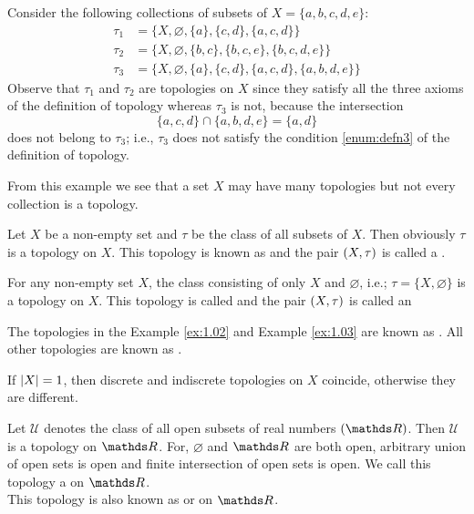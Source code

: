 \documentclass[../main-sheet.tex]{subfiles}
\begin{document}
    \begin{ex}
        Consider the following collections of subsets of  \(X = \{a,b, c, d,e\}\):
        \begin{align*}
            \tau_1 &= \{X, \varnothing, \{a\}, \{c,d\},\{a,c,d\}\}\\
            \tau_2 &= \{X, \varnothing, \{b, c\}, \{b, c, e\}, \{b, c, d,e\}\}\\
            \tau_3&= \{X,\varnothing, \{a\}, \{c, d\}, \{a,c,d\}, \{a, b, d, e\}\}
        \end{align*}            
        Observe that  \(\tau_1\) and  \(\tau_2\) are topologies on  \(X\) since they satisfy all the three axioms of the definition of topology whereas  \(\tau_3\) is not, because the intersection
        \[
            \{a, c, d\} \cap \{a, b, d, e\} = \{a,d\}
        \]
        does not belong to  \(\tau_3\); i.e.,  \(\tau_3\) does not satisfy the condition \ref{enum:defn3} of the definition of topology.
    \end{ex}
From this example we see that a set  \(X\) may have many topologies but not every collection is a topology.
\begin{ex}
    \label{ex:1.02}
    Let  \(X\) be a non-empty set and  \(\tau\) be the class of all subsets of  \(X\). Then obviously  \(\tau\) is a topology on  \(X\).
    This topology is known as  and the pair  \((X, \tau)\) is called a .
\end{ex}
\begin{ex}
    \label{ex:1.03}
    For any non-empty set  \(X\), the class consisting of only  \(X\) and  \(\varnothing\), i.e.;  \(\tau=\{X,\varnothing\}\) is a topology on  \(X\). This topology is called  and the pair  \((X, \tau)\) is called an 
\end{ex}
The topologies in the Example \ref{ex:1.02} and Example \ref{ex:1.03} are known as . All other topologies are known as .
\begin{rem}
    If  \(\left\vert X\right\vert = 1\), then discrete and indiscrete topologies on  \(X\) coincide, otherwise they are different.
\end{rem}
\begin{ex}
    Let  \(\mathscr{U}\) denotes the class of all open subsets of real numbers  \((\R)\). Then  \(\mathscr{U}\) is a topology on  \(\R\). For,  \(\varnothing\) and  \(\R\) are both open, arbitrary union of open sets is open and finite intersection of open sets is open. We call this topology a  on  \(\R\).\\
    This topology is also known as  or  on  \(\R\).
\end{ex}
\end{document}
